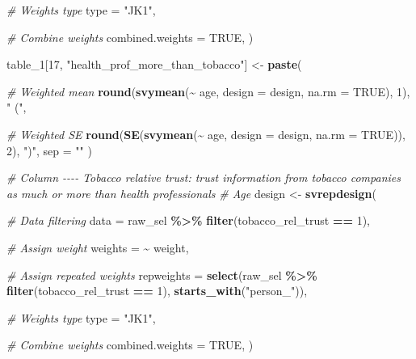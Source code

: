 \documentclass[
]{article}
\newenvironment{Shaded}{\begin{snugshade}}{\end{snugshade}}
\newcommand{\AttributeTok}[1]{\textcolor[rgb]{0.13,0.29,0.53}{#1}}
\newcommand{\CommentTok}[1]{\textcolor[rgb]{0.56,0.35,0.01}{\textit{#1}}}
\newcommand{\ConstantTok}[1]{\textcolor[rgb]{0.56,0.35,0.01}{#1}}
\newcommand{\DecValTok}[1]{\textcolor[rgb]{0.00,0.00,0.81}{#1}}
\newcommand{\FunctionTok}[1]{\textcolor[rgb]{0.13,0.29,0.53}{\textbf{#1}}}
\newcommand{\NormalTok}[1]{#1}
\newcommand{\OtherTok}[1]{\textcolor[rgb]{0.56,0.35,0.01}{#1}}
\newcommand{\SpecialCharTok}[1]{\textcolor[rgb]{0.81,0.36,0.00}{\textbf{#1}}}
\newcommand{\StringTok}[1]{\textcolor[rgb]{0.31,0.60,0.02}{#1}}
\begin{document}
\begin{Shaded}
\begin{Highlighting}[]
  \CommentTok{\# Weights type}
  \AttributeTok{type =} \StringTok{"JK1"}\NormalTok{,}
  
  \CommentTok{\# Combine weights}
  \AttributeTok{combined.weights =} \ConstantTok{TRUE}\NormalTok{,}
\NormalTok{)}
  
\NormalTok{table\_1[}\DecValTok{17}\NormalTok{, }\StringTok{"health\_prof\_more\_than\_tobacco"}\NormalTok{] }\OtherTok{\textless{}{-}} \FunctionTok{paste}\NormalTok{(}
  
  \CommentTok{\# Weighted mean}
  \FunctionTok{round}\NormalTok{(}\FunctionTok{svymean}\NormalTok{(}\SpecialCharTok{\textasciitilde{}}\NormalTok{ age, }\AttributeTok{design =}\NormalTok{ design, }\AttributeTok{na.rm =} \ConstantTok{TRUE}\NormalTok{), }\DecValTok{1}\NormalTok{),}
  \StringTok{" ("}\NormalTok{,}
  
  \CommentTok{\# Weighted SE}
  \FunctionTok{round}\NormalTok{(}\FunctionTok{SE}\NormalTok{(}\FunctionTok{svymean}\NormalTok{(}\SpecialCharTok{\textasciitilde{}}\NormalTok{ age, }\AttributeTok{design =}\NormalTok{ design, }\AttributeTok{na.rm =} \ConstantTok{TRUE}\NormalTok{)), }\DecValTok{2}\NormalTok{),}
  \StringTok{")"}\NormalTok{,}
  \AttributeTok{sep =} \StringTok{""}
\NormalTok{)}


\CommentTok{\# Column {-}{-}{-}{-} Tobacco relative trust: trust information from tobacco companies as much or more than health professionals}
\CommentTok{\# Age}
\NormalTok{design }\OtherTok{\textless{}{-}} \FunctionTok{svrepdesign}\NormalTok{(}
  
  \CommentTok{\# Data filtering}
  \AttributeTok{data =}\NormalTok{ raw\_sel }\SpecialCharTok{\%\textgreater{}\%} \FunctionTok{filter}\NormalTok{(tobacco\_rel\_trust }\SpecialCharTok{==} \DecValTok{1}\NormalTok{),}
  
  \CommentTok{\# Assign weight}
  \AttributeTok{weights =} \SpecialCharTok{\textasciitilde{}}\NormalTok{ weight,}
  
  \CommentTok{\# Assign repeated weights}
  \AttributeTok{repweights =} \FunctionTok{select}\NormalTok{(raw\_sel }\SpecialCharTok{\%\textgreater{}\%} \FunctionTok{filter}\NormalTok{(tobacco\_rel\_trust }\SpecialCharTok{==} \DecValTok{1}\NormalTok{), }\FunctionTok{starts\_with}\NormalTok{(}\StringTok{"person\_"}\NormalTok{)),}
  
  \CommentTok{\# Weights type}
  \AttributeTok{type =} \StringTok{"JK1"}\NormalTok{,}
  
  \CommentTok{\# Combine weights}
  \AttributeTok{combined.weights =} \ConstantTok{TRUE}\NormalTok{,}
\NormalTok{)}
  

\end{Highlighting}
\end{Shaded}
\end{document}

